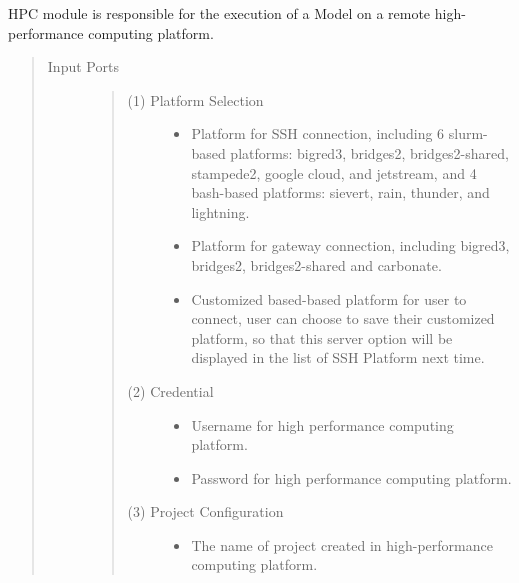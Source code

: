 \documentclass[letterpaper,10pt,english]{sphinxmanual}
\begin{document}
\begin{fulllineitems}
\label{\detokenize{AgentTools.HPC:AgentTools.HPC.HPC.HPC}}
HPC module is responsible for the execution of a Model on a remote high-performance computing platform.
\begin{quote}\begin{description}
\item[{Input Ports}] \leavevmode\begin{quote}\begin{description}
\item[{(1) Platform Selection}] \leavevmode\begin{itemize}
\item {} 
 Platform for SSH connection, including 6 slurm-based platforms: bigred3, bridges2, bridges2-shared, stampede2, google cloud, and jetstream, and 4 bash-based platforms: sievert, rain, thunder, and lightning.

\item {} 
 Platform for gateway connection, including bigred3, bridges2, bridges2-shared and carbonate.

\item {} 
 Customized based-based platform for user to connect, user can choose to save their customized platform, so that this server option will be displayed in the list of SSH Platform next time.

\end{itemize}

\item[{(2) Credential}] \leavevmode\begin{itemize}
\item {} 
 Username for high performance computing platform.

\item {} 
 Password for high performance computing platform.

\end{itemize}

\item[{(3) Project Configuration}] \leavevmode\begin{itemize}
\item {} 
 The name of project created in high-performance computing platform.


\end{itemize}
\end{description}
\end{quote}
\end{description}
\end{quote}
\end{fulllineitems}
\end{document}
